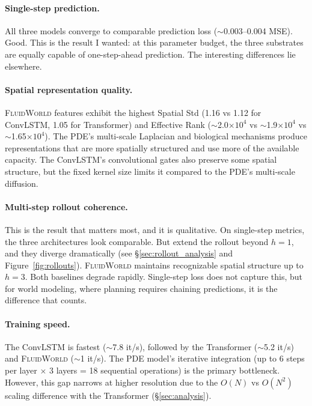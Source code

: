 \documentclass{article}
\newcommand{\fluidworld}{\textsc{FluidWorld}}
\begin{document}
\paragraph{Single-step prediction.} All three models converge to comparable prediction loss ($\sim$0.003--0.004 MSE). Good. This is the result I wanted: at this parameter budget, the three substrates are equally capable of one-step-ahead prediction. The interesting differences lie elsewhere.

\paragraph{Spatial representation quality.} \fluidworld{} features exhibit the highest Spatial Std (1.16 vs 1.12 for ConvLSTM, 1.05 for Transformer) and Effective Rank ($\sim$2.0$\times 10^4$ vs $\sim$1.9$\times 10^4$ vs $\sim$1.65$\times 10^4$). The PDE's multi-scale Laplacian and biological mechanisms produce representations that are more spatially structured and use more of the available capacity. The ConvLSTM's convolutional gates also preserve some spatial structure, but the fixed kernel size limits it compared to the PDE's multi-scale diffusion.

\paragraph{Multi-step rollout coherence.} This is the result that matters most, and it is qualitative. On single-step metrics, the three architectures look comparable. But extend the rollout beyond $h\!=\!1$, and they diverge dramatically (see \S\ref{sec:rollout_analysis} and Figure~\ref{fig:rollouts}). \fluidworld{} maintains recognizable spatial structure up to $h\!=\!3$. Both baselines degrade rapidly. Single-step loss does not capture this, but for world modeling, where planning requires chaining predictions, it is the difference that counts.

\paragraph{Training speed.} The ConvLSTM is fastest ($\sim$7.8 it/s), followed by the Transformer ($\sim$5.2 it/s) and \fluidworld{} ($\sim$1 it/s). The PDE model's iterative integration (up to 6 steps per layer $\times$ 3 layers = 18 sequential operations) is the primary bottleneck. However, this gap narrows at higher resolution due to the $O(N)$ vs $O(N^2)$ scaling difference with the Transformer (\S\ref{sec:analysis}).
\end{document}
